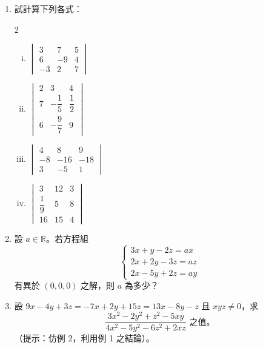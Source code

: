 \begin{enumerate}[1.]
  \item 試計算下列各式：
  \begin{multicols}{2}
  \begin{enumerate}[(i)]
    \item $\begin{vmatrix} 3 & 7 & 5 \\ 6 & -9 & 4 \\ -3 & 2 & 7 \end{vmatrix}$
    \item $\begin{vmatrix} 2 & 3 & 4 \\ 7 & -\dfrac{1}{5} & \dfrac{1}{2} \\ 6 & -\dfrac{9}{7} & 9 \end{vmatrix}$
    \item $\begin{vmatrix} 4 & 8 & 9 \\ -8 & -16 & -18 \\ 3 & -5 & 1 \end{vmatrix}$
    \item $\begin{vmatrix} 3 & 12 & 3 \\ \dfrac{1}{9} & 5 & 8 \\ 16 & 15 & 4 \end{vmatrix}$
  \end{enumerate}
  \end{multicols}

  \item 設 $a \in \mathbb{R}$。若方程組
  \begin{equation*}
  \begin{cases}
    3x+y-2z = ax \\
    2x+2y-3z = az \\
    2x-5y+2z = ay
  \end{cases}
  \end{equation*}
  有異於 $(0,0,0)$ 之解，則 $a$ 為多少？\footnotemark

  \item 設 $9x-4y+3z = -7x+2y+15z = 13x-8y-z$ 且 $xyz \neq 0$，求
  \begin{equation*}
    \frac{3x^2-2y^2+z^2-5xy}{4x^2-5y^2-6z^2+2xz} \text{ 之值。}
  \end{equation*}
  （提示：仿例 2，利用例 1 之結論）。
\end{enumerate}
